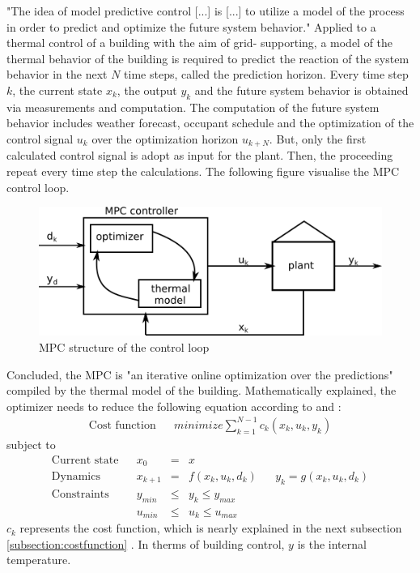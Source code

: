 "The idea of model predictive control [...] is [...] to utilize a model of the process in order to predict and optimize the future system behavior."
\cite{Grune.2017}
Applied to a thermal control of a building with the aim of grid- supporting, a model of the thermal behavior of the building is required to predict the reaction of the system behavior in the next $N$ time steps, called the prediction horizon. Every time step $k$, the current state \textbf{$x_k$}, the output \textbf{$y_k$} and the future system behavior is obtained via measurements and computation. The computation of the future system behavior includes weather forecast, occupant schedule  and the optimization of the control signal \textbf{$u_k$} over the optimization horizon \textbf{$u_{k+N}$}. But, only the first calculated control signal is adopt as input for the plant.
Then, the proceeding repeat every time step the calculations. The following figure visualise the MPC control loop.
 \begin{figure}[h]
    \centering
    \includegraphics[scale=0.8]{figure/MPC beispiel2.png}
    \caption{MPC structure of the control loop}
    \label{fig:sampleMPC}
    \end{figure}
\newline
Concluded, the MPC is "an iterative online optimization over the predictions"
\cite{Grune.2017} 
compiled by the thermal model of the building. Mathematically explained, the optimizer needs to reduce the following equation according to
\cite{Kouvaritakis.2018}
and
\cite{Oldewurtel.2012}:
\begin{align}
\label{eq:costfunc}
\textrm{Cost function} && minimize \sum_{k=1}^{N-1} c_k(x_k,u_k,y_k)
\end{align}
subject to 
\begin{align*}
\textrm{Current state} && x_0 &=& x \\	
\textrm{Dynamics} && x_{k+1}&=& f(x_k,u_k,d_k)		&&	y_k = g(x_k,u_k,d_k)\\				
\textrm{Constraints} && y_{min}&\leq& y_k \leq y_{max}\\		
\textrm{} && u_{min}&\leq& u_k \leq u_{max}	
\end{align*}
$c_k$ represents the cost function, which is nearly explained in the next subsection  \ref{subsection:costfunction}
. In therms of building control, $y$ is the internal temperature.

